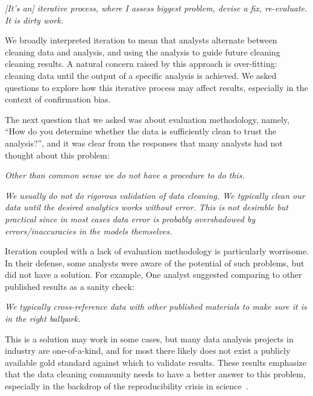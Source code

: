 \vspace{0.7em}
\emph{[It's an] iterative process, where I assess biggest problem, devise a fix, re-evaluate. It is dirty work.}

\vspace{0.5em}

We broadly interpreted iteration to mean that analysts alternate between cleaning data and analysis, and using the analysis to guide future cleaning cleaning results.
A natural concern raised by this approach is over-fitting: cleaning data until the output of a specific analysis is achieved.
We asked questions to explore how this iterative process may affect results, especially in the context of confirmation bias.

The next question that we asked was about evaluation methodology, namely, ``How do you determine whether the data is sufficiently clean to trust the analysis?'', and it was clear from the responses that many analysts had not thought about this problem:

\vspace{0.5em}
\emph{Other than common sense we do not have a procedure to do this.}

\vspace{0.7em}
\emph{We usually do not do rigorous validation of data cleaning. We typically clean our data until the desired analytics works without error. This is not desirable but practical since in most cases data error is probably overshadowed by errors/inaccuracies in the models themselves.}

\vspace{0.5em}

Iteration coupled with a lack of evaluation methodology is particularly worrisome.
In their defense, some analysts were aware of the potential of such problems, but did not have a solution.
For example, One analyst suggested comparing to other published results as a sanity check:

\vspace{0.5em}
\emph{We typically cross-reference data with other published materials to make sure it is in the right ballpark.}
\vspace{0.5em}

This is a solution may work in some cases, but many data analysis projects in industry are one-of-a-kind, and for most there likely does not exist a publicly available gold standard against which to validate results.
These results emphasize that the data cleaning community needs to have a better answer to this problem, especially in the backdrop of the reproducibility crisis in science~\cite{reproducibility}.

